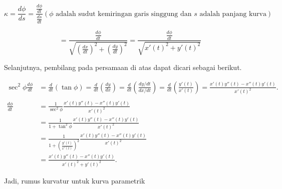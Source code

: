 \documentclass[12pt,arial,letterpaper]{book}
\begin{document}
\begin{eulernootebook}
\begin{eulercomment}
\begin{eulercomment}
\begin{eulernootebook}
\begin{eulercomment}
\begin{eulercomment}
\begin{eulercomment}
\begin{eulercomment}
\begin{eulercomment}
\begin{eulercomment}
\begin{eulernotebook}
\begin{eulercomment}
\begin{eulercomment}
\begin{eulercomment}
\begin{eulercomment}
\begin{eulercomment}
\begin{eulercomment}
\begin{eulercomment}
\begin{eulercomment}
\begin{eulercomment}
\begin{eulercomment}
\begin{eulercomment}
\begin{eulercomment}
\begin{eulercomment}
\begin{eulercomment}
\begin{eulercomment}
\begin{eulercomment}
\begin{eulercomment}
\begin{eulercomment}
\begin{eulercomment}
\begin{eulercomment}
\begin{eulercomment}
\end{eulercomment}
\begin{eulerformula}
\[
\kappa=\frac{d\phi}{ds}=\frac{\frac{d\phi}{dt}}{\frac{ds}{dt}}  (\phi \text{ adalah sudut kemiringan garis singgung dan } s \text{ adalah panjang kurva})
\]
\end{eulerformula}
\begin{eulercomment}
\end{eulercomment}
\begin{eulerformula}
\[
=\frac{\frac{d\phi}{dt}}{\sqrt{(\frac{dx}{dt})^2 + (\frac{dy}{dt})^2}} = \frac{\frac{d\phi}{dt}}{\sqrt{x'(t)^2+y'(t)^2}}
\]
\end{eulerformula}
\begin{eulercomment}
Selanjutnya, pembilang pada persamaan di atas dapat dicari sebagai
berikut.

\end{eulercomment}
\begin{eulerformula}
\[
\begin{aligned}\sec^2\phi\frac{d\phi}{dt} &= \frac{d}{dt}\left(\tan\phi\right)= \frac{d}{dt}\left(\frac{dy}{dx}\right)= \frac{d}{dt}\left(\frac{dy/dt}{dx/dt}\right)= \frac{d}{dt}\left(\frac{y'(t)}{x'(t)}\right)=\frac{x'(t)y''(t)-x''(t)y'(t)}{x'(t)^2}.\\ & \\ \frac{d\phi}{dt} &= \frac{1}{\sec^2\phi}\frac{x'(t)y''(t)-x''(t)y'(t)}{x'(t)^2}\\ &= \frac{1}{1+\tan^2\phi}\frac{x'(t)y''(t)-x''(t)y'(t)}{x'(t)^2}\\ &= \frac{1}{1+\left(\frac{y'(t)}{x'(t)}\right)^2}\frac{x'(t)y''(t)-x''(t)y'(t)}{x'(t)^2}\\ &= \frac{x'(t)y''(t)-x''(t)y'(t)}{x'(t)^2+y'(t)^2}.\end{aligned}
\]
\end{eulerformula}
\begin{eulercomment}
Jadi, rumus kurvatur untuk kurva parametrik


\end{eulercomment}
\end{eulercomment}
\end{eulercomment}
\end{eulercomment}
\end{eulercomment}
\end{eulercomment}
\end{eulercomment}
\end{eulercomment}
\end{eulercomment}
\end{eulercomment}
\end{eulercomment}
\end{eulercomment}
\end{eulercomment}
\end{eulercomment}
\end{eulercomment}
\end{eulercomment}
\end{eulercomment}
\end{eulercomment}
\end{eulercomment}
\end{eulercomment}
\end{eulercomment}
\end{eulernotebook}
\end{eulercomment}
\end{eulercomment}
\end{eulercomment}
\end{eulercomment}
\end{eulercomment}
\end{eulercomment}
\end{eulernootebook}
\end{eulercomment}
\end{eulercomment}
\end{eulernootebook}
\end{document}
